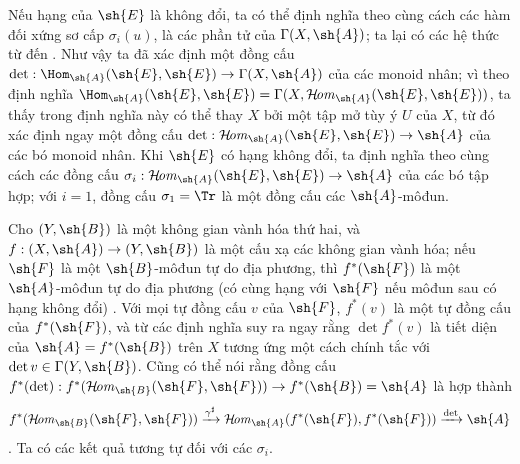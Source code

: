 \documentclass[oneside,10pt]{amsart}
\makeatletter
\newcommand{\ega@arrow}[2]{\mathchoice{#1}{#2}{#2}{#2}}
\renewcommand{\to}{\ega@arrow{\longrightarrow}{\rightarrow}}
\def\shHom{\mathcal{H}\!\mathit{om}}
\newcommand{\oldpage}[2][]{\marginnote{\normalfont\footnotesize\textbf{#1}~|~#2}\ignorespaces}
\makeatother
\begin{document}
\begin{env}[6.4.8]
Nếu hạng của $\sh{E}$ là không đổi, ta có thể định nghĩa theo cùng cách các hàm đối xứng sơ cấp $\sigma_i(u)$, là các phần tử của $\Gamma(X,\sh{A})$;
ta lại có các hệ thức từ  đến .
\oldpage[II]{124}
Như vậy ta đã xác định một đồng cấu $\det:\Hom_{\sh{A}}(\sh{E},\sh{E})\to\Gamma(X,\sh{A})$ của các monoid nhân;
vì theo định nghĩa $\Hom_{\sh{A}}(\sh{E},\sh{E})=\Gamma(X,\shHom_{\sh{A}}(\sh{E},\sh{E}))$, ta thấy trong định nghĩa này có thể thay $X$ bởi một tập mở tùy ý $U$ của $X$, từ đó xác định ngay một đồng cấu $\det:\shHom_{\sh{A}}(\sh{E},\sh{E})\to\sh{A}$ của các bó monoid nhân.
Khi $\sh{E}$ có hạng không đổi, ta định nghĩa theo cùng cách các đồng cấu $\sigma_i:\shHom_{\sh{A}}(\sh{E},\sh{E})\to\sh{A}$ của các bó tập hợp;
với $i=1$, đồng cấu $\sigma_1=\Tr$ là một đồng cấu các $\sh{A}$-môđun.

Cho $(Y,\sh{B})$ là một không gian vành hóa thứ hai, và $f:(X,\sh{A})\to(Y,\sh{B})$ là một cấu xạ các không gian vành hóa;
nếu $\sh{F}$ là một $\sh{B}$-môđun tự do địa phương, thì $f^*(\sh{F})$ là một $\sh{A}$-môđun tự do địa phương (có cùng hạng với $\sh{F}$ nếu môđun sau có hạng không đổi) .
Với mọi tự đồng cấu $v$ của $\sh{F}$, $f^*(v)$ là một tự đồng cấu của $f^*(\sh{F})$, và từ các định nghĩa suy ra ngay rằng $\det f^*(v)$ là tiết diện của $\sh{A}=f^*(\sh{B})$ trên $X$ tương ứng một cách chính tắc với $\det v\in\Gamma(Y,\sh{B})$.
Cũng có thể nói rằng đồng cấu $f^*(\det):f^*(\shHom_{\sh{B}}(\sh{F},\sh{F}))\to f^*(\sh{B})=\sh{A}$ là hợp thành
\[
  f^*(\shHom_{\sh{B}}(\sh{F},\sh{F}))
  \xrightarrow{\gamma^\sharp} \shHom_{\sh{A}}(f^*(\sh{F}),f^*(\sh{F}))
  \xrightarrow{\det} \sh{A}
\]
.
Ta có các kết quả tương tự đối với các $\sigma_i$.
\end{env}
\end{document}

